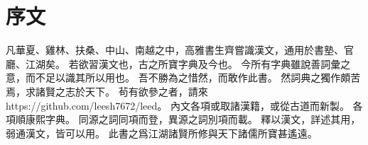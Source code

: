 \chapter*{序文}
凡華夏、雞林、扶桑、中山、南越之中，高雅書生齊嘗識漢文，通用於書塾、官廳、江湖矣。
若欲習漢文也，古之所寶字典及今也。
今所有字典雖說善詞彙之意，而不足以識其所以用也。
吾不勝為之惜然，而敢作此書。
然詞典之獨作頗苦焉，求諸賢之志於天下。
茍有欲參之者，請來 https://github.com/leesh7672/leed。
內文各項或取諸漢籍，或從古道而新製。
各項順康熙字典。
同源之詞同項而登，異源之詞別項而載。
釋以漢文，詳述其用，弱通漢文，皆可以用。
此書之爲江湖諸賢所修與天下諸儒所寶甚遙遠。
